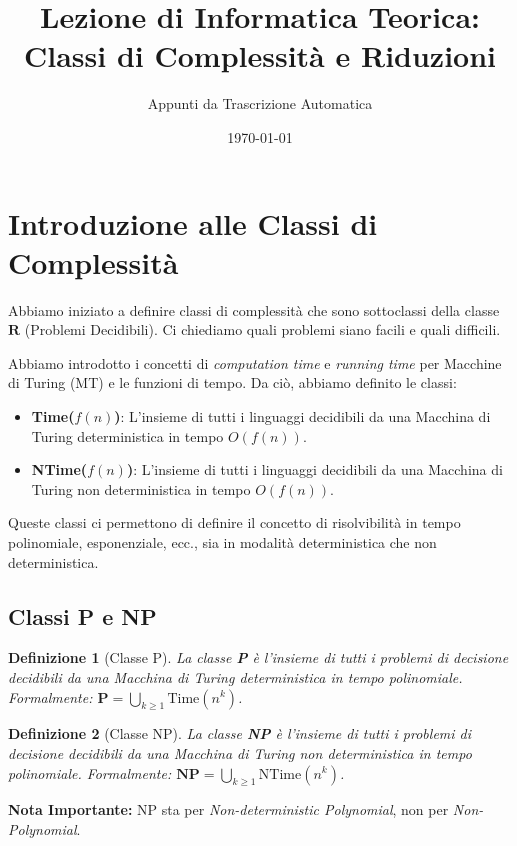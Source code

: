 \documentclass[a4paper]{article}
\title{Lezione di Informatica Teorica: Classi di Complessità e Riduzioni}
\author{Appunti da Trascrizione Automatica}
\date{\today}
\newtheorem{definition}{Definizione}
\begin{document}
\maketitle
\tableofcontents
\newpage

\section{Introduzione alle Classi di Complessità}

Abbiamo iniziato a definire classi di complessità che sono sottoclassi della classe $\mathbf{R}$ (Problemi Decidibili). Ci chiediamo quali problemi siano facili e quali difficili.

Abbiamo introdotto i concetti di \emph{computation time} e \emph{running time} per Macchine di Turing (MT) e le funzioni di tempo. Da ciò, abbiamo definito le classi:
\begin{itemize}
    \item \textbf{Time($f(n)$)}: L'insieme di tutti i linguaggi decidibili da una Macchina di Turing deterministica in tempo $O(f(n))$.
    \item \textbf{NTime($f(n)$)}: L'insieme di tutti i linguaggi decidibili da una Macchina di Turing non deterministica in tempo $O(f(n))$.
\end{itemize}

Queste classi ci permettono di definire il concetto di risolvibilità in tempo polinomiale, esponenziale, ecc., sia in modalità deterministica che non deterministica.

\subsection{Classi P e NP}

\begin{definition}[Classe P]
La classe \textbf{P} è l'insieme di tutti i problemi di decisione decidibili da una Macchina di Turing deterministica in tempo polinomiale.
Formalmente: $\mathbf{P} = \bigcup_{k \ge 1} \text{Time}(n^k)$.
\end{definition}

\begin{definition}[Classe NP]
La classe \textbf{NP} è l'insieme di tutti i problemi di decisione decidibili da una Macchina di Turing non deterministica in tempo polinomiale.
Formalmente: $\mathbf{NP} = \bigcup_{k \ge 1} \text{NTime}(n^k)$.
\end{definition}

\textbf{Nota Importante:} NP sta per \emph{Non-deterministic Polynomial}, non per \emph{Non-Polynomial}.
\end{document}

